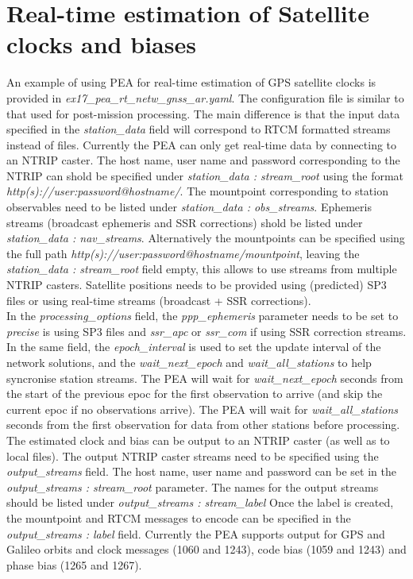 \section{Real-time estimation of Satellite clocks and biases}
An example of using PEA for real-time estimation of GPS satellite clocks is provided in \textit{ex17\_pea\_rt\_netw\_gnss\_ar.yaml}.
The configuration file is similar to that used for post-mission processing.
The main difference is that the input data specified in the \textit{station\_data} field will correspond to RTCM formatted streams instead of files.
Currently the PEA can only get real-time data by connecting to an NTRIP caster.
The host name, user name and password corresponding to the NTRIP can shold be specified under \textit{station\_data : stream\_root} using the format \textit{http(s)://user:password@hostname/}.
The mountpoint corresponding to station observables need to be listed under \textit{station\_data : obs\_streams}.
Ephemeris streams (broadcast ephemeris and SSR corrections) shold be listed under \textit{station\_data : nav\_streams}.
Alternatively the mountpoints can be specified using the full path \textit{http(s)://user:password@hostname/mountpoint}, leaving the  \textit{station\_data : stream\_root} field empty,  this allows to use streams from multiple NTRIP casters.
Satellite positions needs to be provided using (predicted) SP3 files or using real-time streams (broadcast + SSR corrections).\\

In the \textit{processing\_options} field, the \textit{ppp\_ephemeris} parameter needs to be set to \textit{precise} is using SP3 files and \textit{ssr\_apc} or \textit{ssr\_com} if using SSR correction streams.
In the same field, the \textit{epoch\_interval} is used to set the update interval of the network solutions, and the \textit{wait\_next\_epoch} and \textit{wait\_all\_stations} to help syncronise station streams.
The PEA will wait for  \textit{wait\_next\_epoch} seconds from the start of the previous epoc for the first observation to arrive (and skip the current epoc if no observations arrive).
The PEA will wait for \textit{wait\_all\_stations} seconds from the first observation for data from other stations before processing.\\

The estimated clock and bias can be output to an NTRIP caster (as well as to local files). 
The output NTRIP caster streams need to be specified using the \textit{output\_streams} field.
The host name, user name and password can be set in the \textit{output\_streams : stream\_root} parameter.
The names for the output streams should be listed under \textit{output\_streams : stream\_label}
Once the label is created, the mountpoint and RTCM messages to encode can be specified in the \textit{output\_streams : label} field.
Currently the PEA supports output for GPS and Galileo orbits and clock messages (1060 and 1243), code bias (1059 and 1243) and phase bias (1265 and 1267).\\ 

